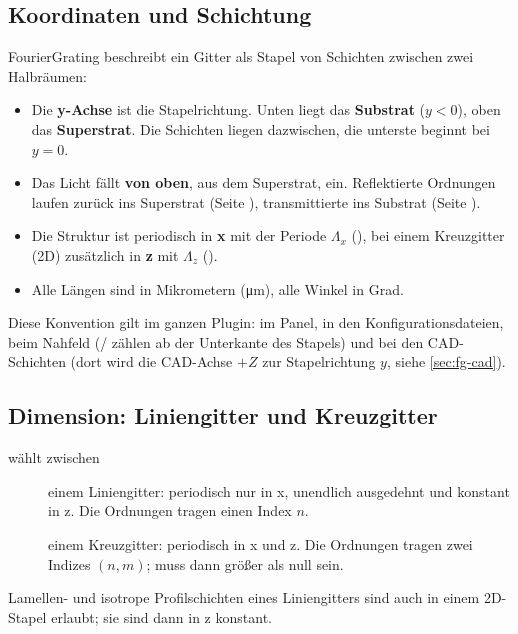 \subsection{Koordinaten und Schichtung}\label{sec:fg-koordinaten}

FourierGrating beschreibt ein Gitter als Stapel von Schichten zwischen zwei Halbräumen:

\begin{itemize}
  \item Die \textbf{y-Achse} ist die Stapelrichtung. Unten liegt das \textbf{Substrat}
    ($y < 0$), oben das \textbf{Superstrat}. Die Schichten liegen dazwischen, die unterste beginnt
    bei $y = 0$.
  \item Das Licht fällt \textbf{von oben}, aus dem Superstrat, ein. Reflektierte Ordnungen laufen
    zurück ins Superstrat (Seite ), transmittierte ins Substrat (Seite ).
  \item Die Struktur ist periodisch in \textbf{x} mit der Periode $\Lambda_x$ (),
    bei einem Kreuzgitter (2D) zusätzlich in \textbf{z} mit $\Lambda_z$ ().
  \item Alle Längen sind in Mikrometern (\si{\micro\metre}), alle Winkel in Grad.
\end{itemize}

Diese Konvention gilt im ganzen Plugin: im Panel, in den Konfigurationsdateien, beim Nahfeld
(/ zählen ab der Unterkante des Stapels) und bei den CAD-Schichten (dort
wird die CAD-Achse $+Z$ zur Stapelrichtung $y$, siehe \autoref{sec:fg-cad}).

\subsection{Dimension: Liniengitter und Kreuzgitter}

 wählt zwischen
\begin{description}
  \item[] einem Liniengitter: periodisch nur in x, unendlich ausgedehnt und konstant in z.
    Die Ordnungen tragen einen Index $n$.
  \item[] einem Kreuzgitter: periodisch in x und z. Die Ordnungen tragen zwei Indizes
    $(n, m)$;  muss dann größer als null sein.
\end{description}

Lamellen- und isotrope Profilschichten eines Liniengitters sind auch in einem 2D-Stapel erlaubt;
sie sind dann in z konstant.

